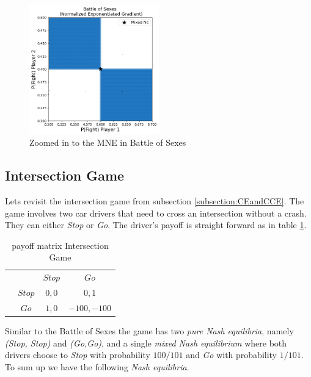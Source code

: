 \begin{figure}[H]
    \centering
    \includegraphics[width=0.5\textwidth]{logos/BattleOfSexes4.png}
    \caption{Zoomed in to the MNE in Battle of Sexes}
    \label{fig:BattleOfSexes4}
\end{figure}


\subsection{Intersection Game}\label{subsection:intersectionGame}

Lets revisit the intersection game from subsection \ref{subsection:CEandCCE}. The game involves two car drivers that need to cross an intersection without a crash. They can either \textit{Stop} or \textit{Go}. The driver's payoff is straight forward as in table \ref{tab:payoffIntersection}. 

\begin{table}[H]\centering
\setlength{\extrarowheight}{2pt}
\begin{tabular}{cc|c|c|}
  & \multicolumn{1}{c}{} & \multicolumn{1}{c}{$Stop$}  & \multicolumn{1}{c}{$Go$} \\\cline{3-4}
  & $Stop$ & $0,0$ & $0,1$ \\\cline{3-4}
  & $Go$ & $1,0$ & $-100,-100$ \\\cline{3-4}
\end{tabular}\caption{\label{tab:payoffIntersection}payoff matrix Intersection Game}
\end{table}

Similar to the Battle of Sexes the game has two \textit{pure Nash equilibria}, namely \textit{(Stop, Stop)} and \textit{(Go,Go)}, and a single \textit{mixed Nash equilibrium} where both drivers choose to \textit{Stop} with probability $100/101$ and \textit{Go} with probability $1/101$. To sum up we have the following \textit{Nash equilibria}.

